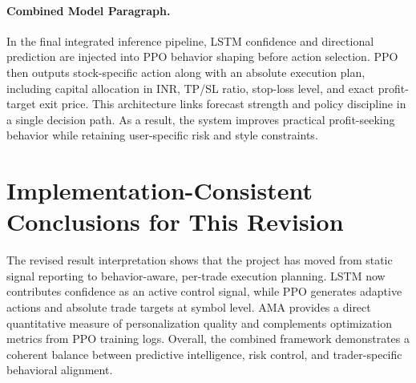 \paragraph{Combined Model Paragraph.}
In the final integrated inference pipeline, LSTM confidence and directional prediction are injected into PPO behavior shaping before action selection. PPO then outputs stock-specific action along with an absolute execution plan, including capital allocation in INR, TP/SL ratio, stop-loss level, and exact profit-target exit price. This architecture links forecast strength and policy discipline in a single decision path. As a result, the system improves practical profit-seeking behavior while retaining user-specific risk and style constraints.

\section{Implementation-Consistent Conclusions for This Revision}

The revised result interpretation shows that the project has moved from static signal reporting to behavior-aware, per-trade execution planning. LSTM now contributes confidence as an active control signal, while PPO generates adaptive actions and absolute trade targets at symbol level. AMA provides a direct quantitative measure of personalization quality and complements optimization metrics from PPO training logs. Overall, the combined framework demonstrates a coherent balance between predictive intelligence, risk control, and trader-specific behavioral alignment.
